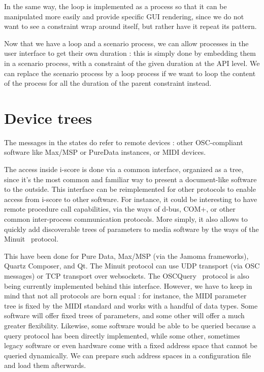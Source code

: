 \documentclass{sigchi}
\begin{document}
In the same way, the loop is implemented as a process so that it can be manipulated more easily and provide specific GUI rendering, since we do not want to see a constraint wrap around itself, but rather have it repeat its pattern.

Now that we have a loop and a scenario process, we can allow processes in the user interface to get their own duration : this is simply done by embedding them in a scenario process, with a constraint of the given duration at the API level. We can replace the scenario process by a loop process if we want to loop the content of the process for all the duration of the parent constraint instead.

\section{Device trees}
The messages in the states do refer to remote devices : other OSC-compliant software like Max/MSP or PureData instances, or MIDI devices. 

The access inside i-score is done via a common interface, organized as a tree, since it's the most common and familiar way to present a document-like software to the outside.
This interface can be reimplemented for other protocols to enable access from i-score to other software. For instance, it could be interesting to have remote procedure call capabilities, via the ways of d-bus, COM+, or other common inter-process communication protocols. More simply, it also allows to quickly add discoverable trees of parameters to media software by the ways of the Minuit~\cite{baltazar2009virage}
protocol. 

This have been done for Pure Data, Max/MSP (via the Jamoma frameworks\cite{place2006jamoma}), Quartz Composer, and Qt. The Minuit protocol can use UDP transport (via OSC messages) or TCP transport over websockets. The OSCQuery~\cite{oscquery} 
protocol is also being currently implemented behind this interface. However, we have to keep in mind that not all protocols are born equal : for instance, the MIDI parameter tree is fixed by the MIDI standard and works with a handful of data types. Some software will offer fixed trees of parameters, and some other will offer a much greater flexibility. Likewise, some software would be able to be queried because a query protocol has been directly implemented, while some other, sometimes legacy software or even hardware come with a fixed address space that cannot be queried dynamically. We can prepare such address spaces in a configuration file and load them afterwards.
\end{document}
